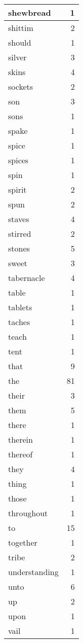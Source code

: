 \begin{center}
\begin{longtable}{l|r}
shewbread & 1 \\ \hline
shittim & 2 \\ \hline
should & 1 \\ \hline
silver & 3 \\ \hline
skins & 4 \\ \hline
sockets & 2 \\ \hline
son & 3 \\ \hline
sons & 1 \\ \hline
spake & 1 \\ \hline
spice & 1 \\ \hline
spices & 1 \\ \hline
spin & 1 \\ \hline
spirit & 2 \\ \hline
spun & 2 \\ \hline
staves & 4 \\ \hline
stirred & 2 \\ \hline
stones & 5 \\ \hline
sweet & 3 \\ \hline
tabernacle & 4 \\ \hline
table & 1 \\ \hline
tablets & 1 \\ \hline
taches & 1 \\ \hline
teach & 1 \\ \hline
tent & 1 \\ \hline
that & 9 \\ \hline
the & 81 \\ \hline
their & 3 \\ \hline
them & 5 \\ \hline
there & 1 \\ \hline
therein & 1 \\ \hline
thereof & 1 \\ \hline
they & 4 \\ \hline
thing & 1 \\ \hline
those & 1 \\ \hline
throughout & 1 \\ \hline
to & 15 \\ \hline
together & 1 \\ \hline
tribe & 2 \\ \hline
understanding & 1 \\ \hline
unto & 6 \\ \hline
up & 2 \\ \hline
upon & 1 \\ \hline
vail & 1 \\ \hline

\end{longtable}
\end{center}
